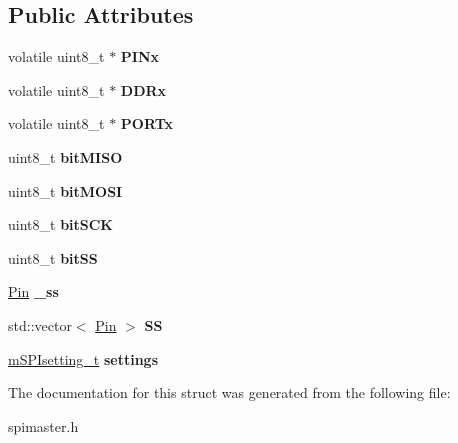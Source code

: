 \subsection*{Public Attributes}
\begin{DoxyCompactItemize}
\item 
\mbox{\label{structmasterSPI__t_a69f13d6f82316cbad3e05aa1067c25ab}} 
volatile uint8\+\_\+t $\ast$ {\bfseries P\+I\+Nx}
\item 
\mbox{\label{structmasterSPI__t_a24aa73fb35508a28c63f1fad2f3548dc}} 
volatile uint8\+\_\+t $\ast$ {\bfseries D\+D\+Rx}
\item 
\mbox{\label{structmasterSPI__t_a819eae46f1e853b89ac501081cb1c2e9}} 
volatile uint8\+\_\+t $\ast$ {\bfseries P\+O\+R\+Tx}
\item 
\mbox{\label{structmasterSPI__t_a9265e0ac3fe401504361a960fce3eb78}} 
uint8\+\_\+t {\bfseries bit\+M\+I\+SO}
\item 
\mbox{\label{structmasterSPI__t_acfbd932e92c901306860214a154e383b}} 
uint8\+\_\+t {\bfseries bit\+M\+O\+SI}
\item 
\mbox{\label{structmasterSPI__t_af26928ddc81c31b6b66dd473d6c63c4c}} 
uint8\+\_\+t {\bfseries bit\+S\+CK}
\item 
\mbox{\label{structmasterSPI__t_a7238d1be10b3bf5e15fd9786d09b3b3f}} 
uint8\+\_\+t {\bfseries bit\+SS}
\item 
\mbox{\label{structmasterSPI__t_a49ce53c491227c03ddb088bf918437d2}} 
\mbox{\hyperlink{classPin}{Pin}} {\bfseries \+\_\+ss}
\item 
\mbox{\label{structmasterSPI__t_ad0195c06fe173b42b66d9169ba1d15df}} 
std\+::vector$<$ \mbox{\hyperlink{classPin}{Pin}} $>$ {\bfseries SS}
\item 
\mbox{\label{structmasterSPI__t_ae2c1bb02c7d7b80d2fff99eacf108eb0}} 
\mbox{\hyperlink{structmSPIsetting__t}{m\+S\+P\+Isetting\+\_\+t}} {\bfseries settings}
\end{DoxyCompactItemize}


The documentation for this struct was generated from the following file\+:\begin{DoxyCompactItemize}
\item 
spimaster.\+h\end{DoxyCompactItemize}

